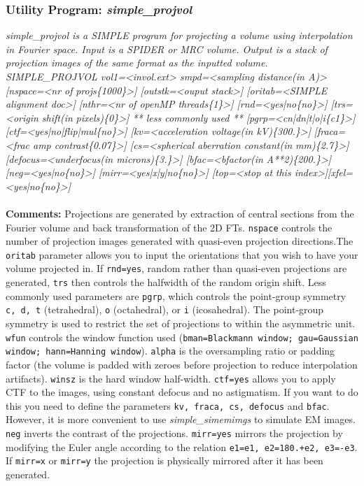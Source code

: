 \documentclass[review]{elsarticle}
\begin{document}
{{\subsubsection{Utility Program: {\it{simple\_projvol}}}
\label{projvol}
{\it{simple\_projvol} is a SIMPLE program for projecting a volume using interpolation in Fourier space. Input is a SPIDER or MRC volume. Output is a stack of projection images of the same format as the inputted volume.}\\
{\it{SIMPLE\_PROJVOL vol1=<invol.ext> smpd=<sampling distance(in A)> [nspace=<nr of}}
{\it{projs\{1000\}>] [outstk=<ouput stack>] [oritab=<SIMPLE alignment doc>]}}
{\it{[nthr=<nr of openMP threads\{1\}>] [rnd=<yes|no\{no\}>] [trs=<origin shift(in}}
{\it{pixels)\{0\}>] ** less commonly used ** [pgrp=<cn|dn|t|o|i\{c1\}>]}}
{\it{[ctf=<yes|no|flip|mul\{no\}>] [kv=<acceleration voltage(in kV)\{300.\}>]}}
{\it{[fraca=<frac amp contrast\{0.07\}>] [cs=<spherical aberration constant(in}}
{\it{mm)\{2.7\}>] [defocus=<underfocus(in microns)\{3.\}>] [bfac=<bfactor(in}}
{\it{A**2)\{200.\}>] [neg=<yes|no\{no\}>] [mirr=<yes|x|y|no\{no\}>] [top=<stop at}}
{\it{this index>][xfel=<yes|no\{no\}>]}}
\\\\
\noindent\textbf{Comments:} Projections are generated by extraction of central sections from the Fourier volume and back transformation of the 2D FTs. \texttt{nspace} controls the number of projection images generated with quasi-even projection directions.The \texttt{oritab} parameter allows you to input the orientations that you wish to have your volume projected in. If \texttt{rnd=yes}, random rather than quasi-even projections are generated, \texttt{trs} then controls the halfwidth of the random origin shift. Less commonly used parameters are \texttt{pgrp}, which controls the point-group symmetry \texttt{c, d, t} (tetrahedral), \texttt{o} (octahedral), or \texttt{i} (icosahedral). The point-group symmetry is used to restrict the set of projections to within the asymmetric unit. \texttt{wfun} controls the window function used (\texttt{bman=Blackmann window; gau=Gaussian window; hann=Hanning window}). \texttt{alpha} is the oversampling ratio or padding factor (the volume is padded with zeroes before projection to reduce interpolation artifacts). \texttt{winsz} is the hard window half-width. \texttt{ctf=yes} allows you to apply CTF to the images, using constant defocus and no astigmatism. If you want to do this you need to define the parameters \texttt{kv, fraca, cs, defocus} and \texttt{bfac}. However, it is more convenient to use  {\it{simple\_simemimgs}} to simulate EM images. \texttt{neg} inverts the contrast of the projections. \texttt{mirr=yes} mirrors the projection by modifying the Euler angle according to the relation \texttt{e1=e1, e2=180.+e2, e3=-e3}. If \texttt{mirr=x} or \texttt{mirr=y} the projection is physically mirrored after it has been generated.

}}
\end{document}
